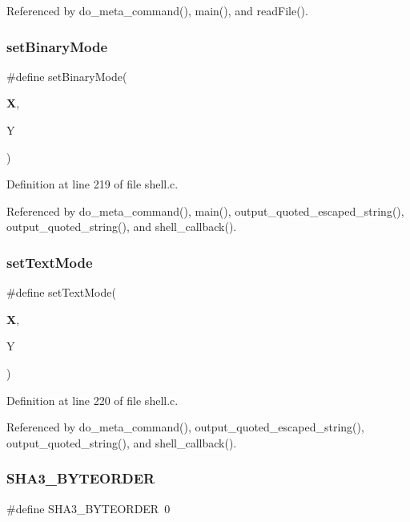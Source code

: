 Referenced by do\+\_\+meta\+\_\+command(), main(), and read\+File().

\mbox{\label{shell_8c_a00c59736db9d6e5bc8c67c93593b9b99}} 
\subsubsection{set\+Binary\+Mode}
{\footnotesize\ttfamily \#define set\+Binary\+Mode(\begin{DoxyParamCaption}\item[{}]{\textbf{ X},  }\item[{}]{Y }\end{DoxyParamCaption})}



Definition at line 219 of file shell.\+c.



Referenced by do\+\_\+meta\+\_\+command(), main(), output\+\_\+quoted\+\_\+escaped\+\_\+string(), output\+\_\+quoted\+\_\+string(), and shell\+\_\+callback().

\mbox{\label{shell_8c_a5e00a80e507c8ba1bdbd250630cf08f1}} 
\subsubsection{set\+Text\+Mode}
{\footnotesize\ttfamily \#define set\+Text\+Mode(\begin{DoxyParamCaption}\item[{}]{\textbf{ X},  }\item[{}]{Y }\end{DoxyParamCaption})}



Definition at line 220 of file shell.\+c.



Referenced by do\+\_\+meta\+\_\+command(), output\+\_\+quoted\+\_\+escaped\+\_\+string(), output\+\_\+quoted\+\_\+string(), and shell\+\_\+callback().

\mbox{\label{shell_8c_a2f48bd1fc145b5de026236beed803192}} 
\subsubsection{S\+H\+A3\+\_\+\+B\+Y\+T\+E\+O\+R\+D\+ER}
{\footnotesize\ttfamily \#define S\+H\+A3\+\_\+\+B\+Y\+T\+E\+O\+R\+D\+ER~0}



